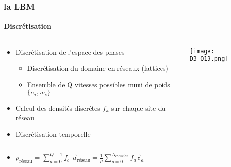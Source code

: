 \documentclass[12pt, xcolor=svgnames]{beamer}
\newcommand{\BeGK}{Bhatnagar, Gross et Krook}
\newcommand{\bwarrow}{\item[\color{DarkRed} \ding{227}]}
\newcommand{\warrow}{\item[\color{blue!50!black!70} \tiny{\ding{109}}]}
\newcommand{\bepar}[1]{
	\left( #1 \right)  
}
\begin{document}





\begin{frame}
\frametitle{la LBM}
\framesubtitle{Discrétisation}
\begin{columns}
	\begin{column}{0.5\textwidth}
		\begin{itemize}
			\bwarrow Discrétisation de l'espace des phases 
				\begin{itemize}
					\warrow Discrétisation du domaine en réseaux (lattices)
					\warrow Ensemble de Q vitesses possibles muni de poids $\{c_a,w_a\}$
				\end{itemize}
			\bwarrow Calcul des densités discrètes $f_a$ sur chaque site du réseau
			\bwarrow Discrétisation temporelle

		\end{itemize}			
	\end{column}
	
	\begin{column}{0.5\textwidth}
			\texttt{[image: D3\_Q19.png]}

	\end{column}
\end{columns}
\begin{itemize}
	\bwarrow $\displaystyle \rho_{\text{réseau}} = \sum_{a=0}^{Q-1} f_a$  \hspace{0.2\textwidth} $\displaystyle \vec{u}_{\text{réseau}} = \frac{1}{\rho} \sum_{a=0}^{N_{chemins}}f_a \vec{c}_a $
\end{itemize}
\end{frame}
\end{document}
